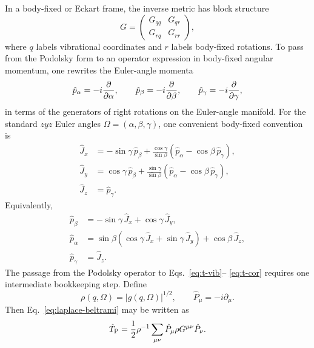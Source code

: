 \documentclass[11pt]{revtex4-2}
\begin{document}
In a body-fixed or Eckart frame, the inverse metric has block structure
\cite{eckart1935,watson1968,bunkerjensen1998,lauvergnat2016}
\begin{equation}
  G
  =
  \begin{pmatrix}
    G_{qq} & G_{q r} \\
    G_{r q} & G_{r r}
  \end{pmatrix},
\end{equation}
where $q$ labels vibrational coordinates and $r$ labels body-fixed
rotations.  To pass from the Podolsky form to an operator expression in
body-fixed angular momentum, one rewrites the Euler-angle momenta
\begin{equation}
  \hat{p}_\alpha = -i\pdv{}{\alpha},
  \qquad
  \hat{p}_\beta = -i\pdv{}{\beta},
  \qquad
  \hat{p}_\gamma = -i\pdv{}{\gamma},
\end{equation}
in terms of the generators of right rotations on the Euler-angle manifold.
For the standard $zyz$ Euler angles
$\Omega=(\alpha,\beta,\gamma)$, one convenient body-fixed convention is
\begin{align}
  \hat{J}_x
  &=
  -\sin\gamma\,\hat{p}_\beta
  +
  \frac{\cos\gamma}{\sin\beta}
  \left(
    \hat{p}_\alpha - \cos\beta\,\hat{p}_\gamma
  \right),
  \nonumber\\
  \hat{J}_y
  &=
  \cos\gamma\,\hat{p}_\beta
  +
  \frac{\sin\gamma}{\sin\beta}
  \left(
    \hat{p}_\alpha - \cos\beta\,\hat{p}_\gamma
  \right),
  \nonumber\\
  \hat{J}_z
  &=
  \hat{p}_\gamma .
  \label{eq:J-from-pOmega}
\end{align}
Equivalently,
\begin{align}
  \hat{p}_\beta
  &=
  -\sin\gamma\,\hat{J}_x
  +
  \cos\gamma\,\hat{J}_y,
  \nonumber\\
  \hat{p}_\alpha
  &=
  \sin\beta
  \left(
    \cos\gamma\,\hat{J}_x
    +
    \sin\gamma\,\hat{J}_y
  \right)
  +
  \cos\beta\,\hat{J}_z,
  \nonumber\\
  \hat{p}_\gamma
  &=
  \hat{J}_z .
  \label{eq:pOmega-from-J}
\end{align}
The passage from the Podolsky operator to Eqs.~\eqref{eq:t-vib}--
\eqref{eq:t-cor} requires one intermediate bookkeeping step.  Define
\begin{equation*}
  \rho(q,\Omega) = |g(q,\Omega)|^{1/2},
  \qquad
  \hat{P}_{\mu} = -i\partial_{\mu}.
\end{equation*}
Then Eq.~\eqref{eq:laplace-beltrami} may be written as
\begin{equation*}
  \hat{T}_{\rm P}
  =
  \frac{1}{2}
  \rho^{-1}
  \sum_{\mu\nu}
  \hat{P}_{\mu}
  \rho G^{\mu\nu}
  \hat{P}_{\nu}.
\end{equation*}
\end{document}
